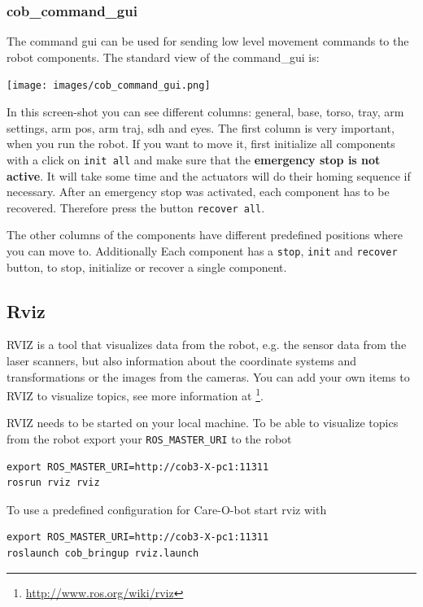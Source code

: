 \subsubsection{cob\_command\_gui}\label{subsec:command_gui}
The command gui can be used for sending low level movement commands to the robot components. The standard view of the command\_gui is:
\begin{center}
 \texttt{[image: images/cob\_command\_gui.png]}
\end{center}

In this screen-shot you can see different columns: general, base, torso, tray, arm settings, arm pos, arm traj, sdh and eyes. The first column is very important, when you run the robot. If you want to move it, first initialize all components with a click on \texttt{init all} and make sure that the \textbf{emergency stop is not active}. It will take some time and the actuators will do their homing sequence if necessary. After an emergency stop was activated, each component has to be recovered. Therefore press the button \texttt{recover all}. 

The other columns of the components have different predefined positions where you can move to. Additionally Each component has a \texttt{stop}, \texttt{init} and \texttt{recover} button, to stop, initialize or recover a single component.

\subsection{Rviz}
RVIZ is a tool that visualizes data from the robot, e.g. the sensor data from the laser scanners, but also information about the coordinate systems and transformations or the images from the cameras. You can add your own items to RVIZ to visualize topics, see more information at \footnote{\url{http://www.ros.org/wiki/rviz}}.

RVIZ needs to be started on your local machine. To be able to visualize topics from the robot export your \texttt{ROS\_MASTER\_URI} to the robot
\begin{lstlisting}
export ROS_MASTER_URI=http://cob3-X-pc1:11311
rosrun rviz rviz
\end{lstlisting}

To use a predefined configuration for Care-O-bot start rviz with
\begin{lstlisting}
export ROS_MASTER_URI=http://cob3-X-pc1:11311
roslaunch cob_bringup rviz.launch
\end{lstlisting}

